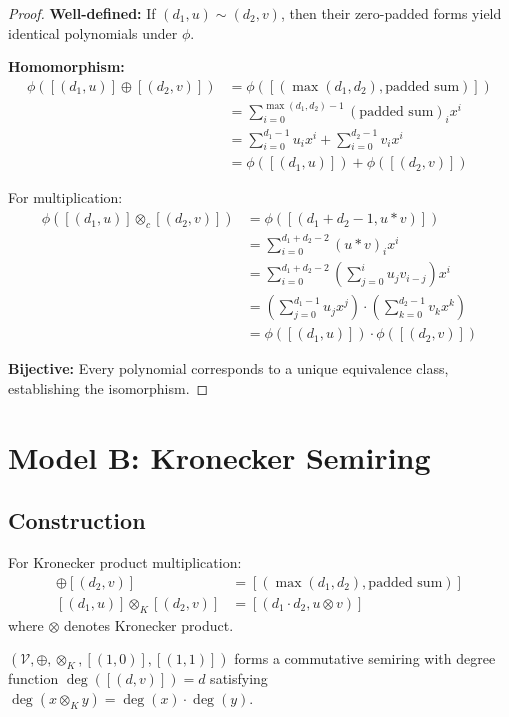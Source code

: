 \documentclass[sigconf,review]{acmart}
\begin{document}
\begin{proof}
\textbf{Well-defined:} If $(d_1,u) \sim (d_2,v)$, then their zero-padded forms yield identical polynomials under $\phi$.

\textbf{Homomorphism:} 
\begin{align}
\phi([(d_1,u)] \oplus [(d_2,v)]) &= \phi([(\max(d_1,d_2), \text{padded sum})]) \\
&= \sum_{i=0}^{\max(d_1,d_2)-1} (\text{padded sum})_i x^i \\
&= \sum_{i=0}^{d_1-1} u_i x^i + \sum_{i=0}^{d_2-1} v_i x^i \\
&= \phi([(d_1,u)]) + \phi([(d_2,v)])
\end{align}

For multiplication:
\begin{align}
\phi([(d_1,u)] \otimes_c [(d_2,v)]) &= \phi([(d_1+d_2-1, u*v)]) \\
&= \sum_{i=0}^{d_1+d_2-2} (u*v)_i x^i \\
&= \sum_{i=0}^{d_1+d_2-2} \left(\sum_{j=0}^i u_j v_{i-j}\right) x^i \\
&= \left(\sum_{j=0}^{d_1-1} u_j x^j\right) \cdot \left(\sum_{k=0}^{d_2-1} v_k x^k\right) \\
&= \phi([(d_1,u)]) \cdot \phi([(d_2,v)])
\end{align}

\textbf{Bijective:} Every polynomial corresponds to a unique equivalence class, establishing the isomorphism.
\end{proof}

\section{Model B: Kronecker Semiring}
\label{sec:modelB}

\subsection{Construction}

For Kronecker product multiplication:
\begin{align}
[(d_1,u)] \oplus [(d_2,v)] &= [(\max(d_1,d_2), \text{padded sum})] \\
[(d_1,u)] \otimes_K [(d_2,v)] &= [(d_1 \cdot d_2, u \otimes v)]
\end{align}
where $\otimes$ denotes Kronecker product.

\begin{theorem}
\label{thm:kronecker-semiring}  
$(\mathcal{V}, \oplus, \otimes_K, [(1,0)], [(1,1)])$ forms a commutative semiring with degree function $\deg([(d,v)]) = d$ satisfying $\deg(x \otimes_K y) = \deg(x) \cdot \deg(y)$.
\end{theorem}
\end{document}
